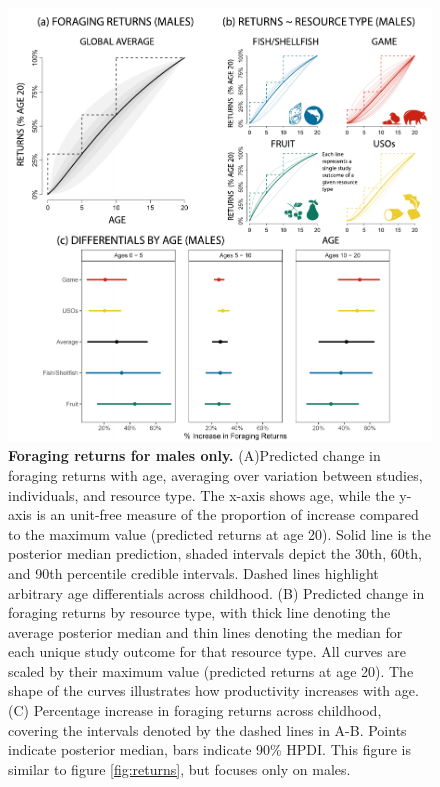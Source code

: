 \begin{figure}[h]
\centering
\includegraphics[width=12cm] {text/images/Figure_S4.pdf}
\renewcommand{\thefigure}{S\arabic{figure}}
\caption{\textbf{Foraging returns for males only.} (A)Predicted change in foraging returns with age, averaging over variation between studies, individuals, and resource type. The x-axis shows age, while the y-axis is an unit-free measure of the proportion of increase compared to the maximum value (predicted returns at age 20). Solid line is the posterior median prediction, shaded intervals depict the 30th, 60th, and 90th percentile credible intervals. Dashed lines highlight arbitrary age differentials across childhood.  (B) Predicted change in foraging returns by resource type, with thick line denoting the average posterior median and thin lines denoting the median for each unique study outcome for that resource type. All curves are scaled by their maximum value (predicted returns at age 20). The shape of the curves illustrates how productivity increases with age. (C) Percentage increase in foraging returns across childhood, covering the intervals denoted by the dashed lines in A-B. Points indicate posterior median, bars indicate 90\% HPDI. This figure is similar to figure \ref{fig:returns}, but focuses only on males.}
\label{fig:males_only}
\end{figure}


